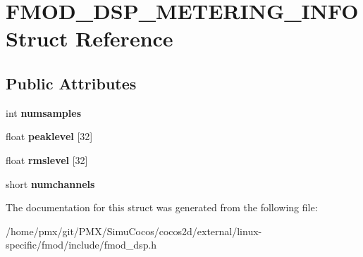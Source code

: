 \hypertarget{structFMOD__DSP__METERING__INFO}{}\section{F\+M\+O\+D\+\_\+\+D\+S\+P\+\_\+\+M\+E\+T\+E\+R\+I\+N\+G\+\_\+\+I\+N\+FO Struct Reference}
\label{structFMOD__DSP__METERING__INFO}
\subsection*{Public Attributes}
\begin{DoxyCompactItemize}
\item 
\mbox{\label{structFMOD__DSP__METERING__INFO_a537ce40b7da3bd4a9b5c4c874e8520ff}} 
int {\bfseries numsamples}
\item 
\mbox{\label{structFMOD__DSP__METERING__INFO_a800fa4abd8bee4066848a93f384ed59f}} 
float {\bfseries peaklevel} \mbox{[}32\mbox{]}
\item 
\mbox{\label{structFMOD__DSP__METERING__INFO_ab8455d015f9718e7c86a2137439d9ada}} 
float {\bfseries rmslevel} \mbox{[}32\mbox{]}
\item 
\mbox{\label{structFMOD__DSP__METERING__INFO_ab657f26f81938d5a024ac1e2f0118ddd}} 
short {\bfseries numchannels}
\end{DoxyCompactItemize}


The documentation for this struct was generated from the following file\+:\begin{DoxyCompactItemize}
\item 
/home/pmx/git/\+P\+M\+X/\+Simu\+Cocos/cocos2d/external/linux-\/specific/fmod/include/fmod\+\_\+dsp.\+h\end{DoxyCompactItemize}
